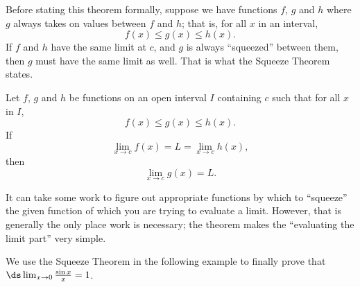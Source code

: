 Before stating this theorem formally, suppose we have functions $f$, $g$ and $h$ where $g$ always takes on values between $f$ and $h$; that is, for all $x$ in an interval, 
\[
f(x) \leq g(x) \leq h(x).
\]
If $f$ and $h$ have the same limit at $c$, and $g$  is always ``squeezed'' between them, then $g$ must have the same limit as well. That is what the Squeeze Theorem states.

{Let $f$, $g$ and $h$ be functions on an open interval $I$ containing $c$ such that for all $x$ in $I$, 
\[
f(x)\leq g(x) \leq h(x).
\]
If 
\[
\lim_{x\to c} f(x) = L = \lim_{x\to c} h(x),
\]
then 
\[
\lim_{x\to c} g(x) = L.
\]
}

It can take some work to figure out appropriate functions by which to ``squeeze'' the given function of which you are trying to evaluate a limit. However, that is generally the only place work is necessary; the theorem makes the ``evaluating the limit part'' very simple. 

We use the Squeeze Theorem in the following example to finally prove that $\ds \lim_{x\to 0} \frac{\sin x}{x} = 1$.\\

